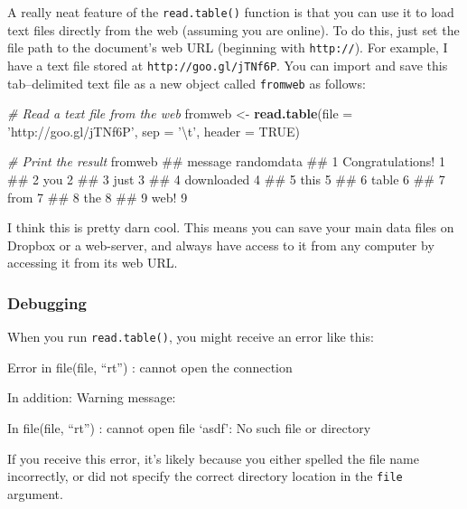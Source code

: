 \documentclass[]{book}
\newenvironment{Shaded}{\begin{snugshade}}{\end{snugshade}}
\newcommand{\KeywordTok}[1]{\textcolor[rgb]{0.13,0.29,0.53}{\textbf{{#1}}}}
\newcommand{\DataTypeTok}[1]{\textcolor[rgb]{0.13,0.29,0.53}{{#1}}}
\newcommand{\CharTok}[1]{\textcolor[rgb]{0.31,0.60,0.02}{{#1}}}
\newcommand{\StringTok}[1]{\textcolor[rgb]{0.31,0.60,0.02}{{#1}}}
\newcommand{\CommentTok}[1]{\textcolor[rgb]{0.56,0.35,0.01}{\textit{{#1}}}}
\newcommand{\OtherTok}[1]{\textcolor[rgb]{0.56,0.35,0.01}{{#1}}}
\newcommand{\NormalTok}[1]{{#1}}
\theoremstyle{definition}
\theoremstyle{definition}
\theoremstyle{remark}
\begin{document}
A really neat feature of the \texttt{read.table()} function is that you
can use it to load text files directly from the web (assuming you are
online). To do this, just set the file path to the document's web URL
(beginning with \texttt{http://}). For example, I have a text file
stored at \texttt{http://goo.gl/jTNf6P}. You can import and save this
tab--delimited text file as a new object called \texttt{fromweb} as
follows:

\begin{Shaded}
\begin{Highlighting}[]
\CommentTok{# Read a text file from the web}
\NormalTok{fromweb <-}\StringTok{ }\KeywordTok{read.table}\NormalTok{(}\DataTypeTok{file =} \StringTok{'http://goo.gl/jTNf6P'}\NormalTok{,}
                      \DataTypeTok{sep =} \StringTok{'}\CharTok{\textbackslash{}t}\StringTok{'}\NormalTok{,}
                      \DataTypeTok{header =} \OtherTok{TRUE}\NormalTok{)}

\CommentTok{# Print the result}
\NormalTok{fromweb}
\NormalTok{##            message randomdata}
\NormalTok{## 1 Congratulations!          1}
\NormalTok{## 2              you          2}
\NormalTok{## 3             just          3}
\NormalTok{## 4       downloaded          4}
\NormalTok{## 5             this          5}
\NormalTok{## 6            table          6}
\NormalTok{## 7             from          7}
\NormalTok{## 8              the          8}
\NormalTok{## 9             web!          9}
\end{Highlighting}
\end{Shaded}

I think this is pretty darn cool. This means you can save your main data
files on Dropbox or a web-server, and always have access to it from any
computer by accessing it from its web URL.

\subsubsection*{Debugging}\label{debugging-1}

When you run \texttt{read.table()}, you might receive an error like
this:

Error in file(file, ``rt'') : cannot open the connection

In addition: Warning message:

In file(file, ``rt'') : cannot open file `asdf': No such file or
directory

If you receive this error, it's likely because you either spelled the
file name incorrectly, or did not specify the correct directory location
in the \texttt{file} argument.
\end{document}
